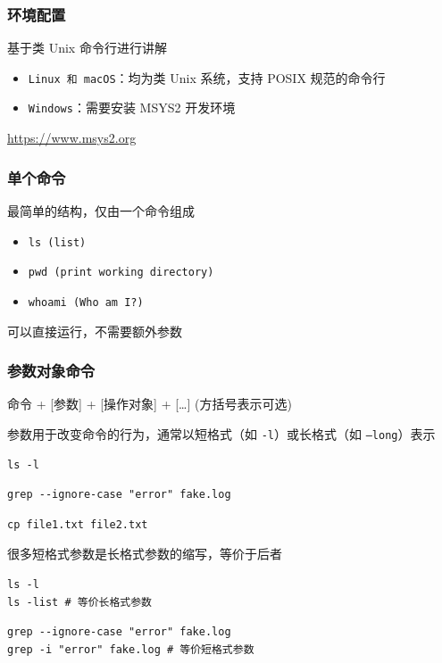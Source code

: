 \documentclass[UTF8, 16pt]{beamer}
\begin{document}
\begin{frame}
    \frametitle{环境配置}
    \textcolor{sufered}{基于类 Unix 命令行进行讲解}
    
    \begin{itemize}
        \item \texttt{Linux 和 macOS}：均为类 Unix 系统，支持 POSIX 规范的命令行
        \item \texttt{Windows}：需要安装 MSYS2 开发环境
    \end{itemize}
    \url{https://www.msys2.org}
\end{frame}

\begin{frame}
    \frametitle{单个命令}
    \textcolor{sufered}{最简单的结构，仅由一个命令组成}
    
    \begin{itemize}
        \item \texttt{ls (list)}
        \item \texttt{pwd (print working directory)}
        \item \texttt{whoami (Who am I?)}
    \end{itemize}
    可以直接运行，不需要额外参数
\end{frame}

\begin{frame}[fragile]
    \frametitle{参数对象命令}
    \textcolor{sufered}{命令 + [参数] + [操作对象] + [\dots] (方括号表示可选)}
    
    参数用于改变命令的行为，通常以短格式（如 \texttt{-l}）或长格式（如 \texttt{--long}）表示
    \begin{lstlisting}[numbers=none]
ls -l\end{lstlisting}
    \begin{lstlisting}[numbers=none]
grep --ignore-case "error" fake.log\end{lstlisting}
    \begin{lstlisting}[numbers=none]
cp file1.txt file2.txt\end{lstlisting}
\end{frame}

\begin{frame}[fragile]
    很多短格式参数是长格式参数的缩写，等价于后者
    \begin{lstlisting}
ls -l
ls -list # 等价长格式参数\end{lstlisting}
    \begin{lstlisting}
grep --ignore-case "error" fake.log
grep -i "error" fake.log # 等价短格式参数\end{lstlisting}
\end{frame}
\end{document}
